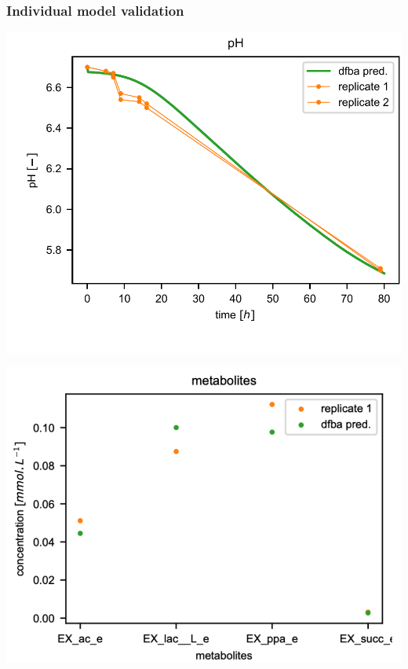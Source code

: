 \documentclass[8pt,usenames,dvipsnames]{beamer}
\begin{document}
\begin{frame}
\frametitle{Individual model validation}
\begin{minipage}{0.5\textwidth}
\includegraphics[width=\textwidth]{figures/validation-lp.pdf}
\end{minipage}%
\begin{minipage}{0.5\textwidth}
\vspace{-0.5cm}
\includegraphics[width=\textwidth]{figures/validation-pf.pdf}
\end{minipage}
\begin{minipage}{0.5\textwidth}
\vspace{-0.3cm}

\end{minipage}
\end{frame}
\end{document}
